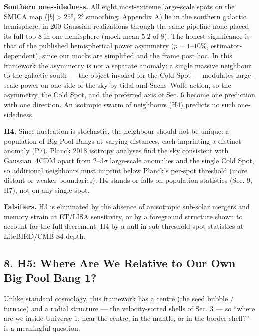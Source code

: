 \documentclass[
]{article}
\begin{document}
\textbf{Southern one-sidedness.} All eight most-extreme large-scale
spots on the SMICA map (\(|b| > 25°\), \(2°\) smoothing; Appendix A) lie
in the southern galactic hemisphere; in 200 Gaussian realizations
through the same pipeline none placed its full top-8 in one hemisphere
(mock mean \(5.2\) of \(8\)). The honest significance is that of the
published hemispherical power asymmetry (\(p \sim 1\)--\(10\%\),
estimator-dependent), since our mocks are simplified and the frame post
hoc. In this framework the asymmetry is not a separate anomaly: a single
massive neighbour to the galactic south --- the object invoked for the
Cold Spot --- modulates large-scale power on one side of the sky by
tidal and Sachs--Wolfe action, so the asymmetry, the Cold Spot, and the
preferred axis of Sec. 6 become one prediction with one direction. An
isotropic swarm of neighbours (H4) predicts no such one-sidedness.

\textbf{H4.} Since nucleation is stochastic, the neighbour should not be
unique: a population of Big Pool Bangs at varying distances, each
imprinting a distinct anomaly (P7). Planck 2018 isotropy analyses find
the sky consistent with Gaussian \(\Lambda\)CDM apart from
\(2\)--\(3\sigma\) large-scale anomalies and the single Cold Spot, so
additional neighbours must imprint below Planck's per-spot threshold
(more distant or weaker boundaries). H4 stands or falls on population
statistics (Sec. 9, H7), not on any single spot.

\textbf{Falsifiers.} H3 is eliminated by the absence of anisotropic
sub-solar mergers and memory strain at ET/LISA sensitivity, or by a
foreground structure shown to account for the full decrement; H4 by a
null in sub-threshold spot statistics at LiteBIRD/CMB-S4 depth.

\hypertarget{h5-where-are-we-relative-to-our-own-big-pool-bang-1}{%
\subsection{\texorpdfstring{\textbf{8. H5: Where Are We Relative to Our
Own Big Pool Bang
1?}}{8. H5: Where Are We Relative to Our Own Big Pool Bang 1?}}\label{h5-where-are-we-relative-to-our-own-big-pool-bang-1}}

Unlike standard cosmology, this framework has a centre (the seed bubble
/ furnace) and a radial structure --- the velocity-sorted shells of Sec.
3 --- so ``where are we inside Universe 1: near the centre, in the
mantle, or in the border shell?'' is a meaningful question.
\end{document}
